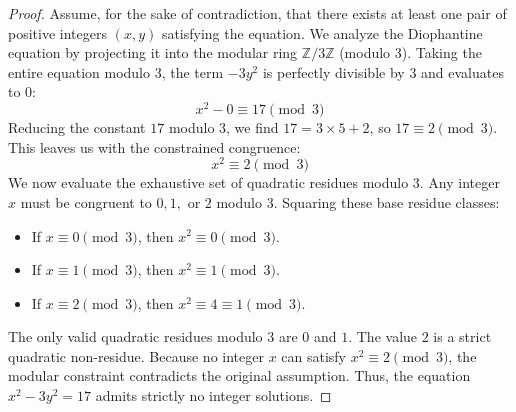 \documentclass[11pt, a4paper]{article}
\theoremstyle{definition}
\theoremstyle{plain}
\begin{document}
\begin{proof}
Assume, for the sake of contradiction, that there exists at least one pair of positive integers $(x, y)$ satisfying the equation.
We analyze the Diophantine equation by projecting it into the modular ring $\mathbb{Z}/3\mathbb{Z}$ (modulo $3$).
Taking the entire equation modulo $3$, the term $-3y^2$ is perfectly divisible by $3$ and evaluates to $0$:
\[
x^2 - 0 \equiv 17 \pmod{3}
\]
Reducing the constant $17$ modulo $3$, we find $17 = 3 \times 5 + 2$, so $17 \equiv 2 \pmod{3}$.
This leaves us with the constrained congruence:
\[
x^2 \equiv 2 \pmod{3}
\]
We now evaluate the exhaustive set of quadratic residues modulo $3$. Any integer $x$ must be congruent to $0, 1,$ or $2$ modulo $3$. Squaring these base residue classes:
\begin{itemize}
    \item If $x \equiv 0 \pmod{3}$, then $x^2 \equiv 0 \pmod{3}$.
    \item If $x \equiv 1 \pmod{3}$, then $x^2 \equiv 1 \pmod{3}$.
    \item If $x \equiv 2 \pmod{3}$, then $x^2 \equiv 4 \equiv 1 \pmod{3}$.
\end{itemize}
The only valid quadratic residues modulo $3$ are $0$ and $1$. The value $2$ is a strict quadratic non-residue. 
Because no integer $x$ can satisfy $x^2 \equiv 2 \pmod{3}$, the modular constraint contradicts the original assumption.
Thus, the equation $x^2 - 3y^2 = 17$ admits strictly no integer solutions.
\end{proof}
\end{document}
